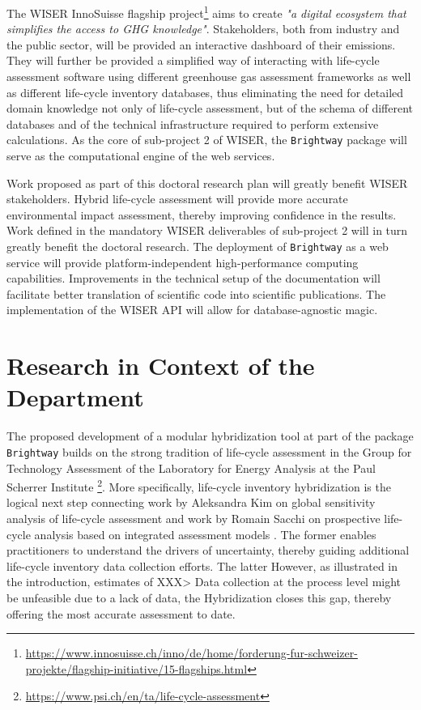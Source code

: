 \documentclass{article}
\begin{document}
    The WISER InnoSuisse flagship project\footnote{\url{https://www.innosuisse.ch/inno/de/home/forderung-fur-schweizer-projekte/flagship-initiative/15-flagships.html}} aims to create \textit{"a digital ecosystem that simplifies the access to GHG knowledge"}. Stakeholders, both from industry and the public sector, will be provided an interactive dashboard of their emissions. They will further be provided a simplified way of interacting with life-cycle assessment software using different greenhouse gas assessment frameworks as well as different life-cycle inventory databases, thus eliminating the need for detailed domain knowledge not only of life-cycle assessment, but of the schema of different databases and of the technical infrastructure required to perform extensive calculations. As the core of sub-project 2 of WISER, the \texttt{Brightway} package will serve as the computational engine of the web services.
    
    Work proposed as part of this doctoral research plan will greatly benefit WISER stakeholders. Hybrid life-cycle assessment will provide more accurate environmental impact assessment, thereby improving confidence in the results. Work defined in the mandatory WISER deliverables of sub-project 2 will in turn greatly benefit the doctoral research. The deployment of \texttt{Brightway} as a web service will provide platform-independent high-performance computing capabilities. Improvements in the technical setup of the documentation will facilitate better translation of scientific code into scientific publications. The implementation of the WISER API will allow for database-agnostic magic.
    
\section{Research in Context of the Department}

    The proposed development of a modular hybridization tool at part of the package \texttt{Brightway} builds on the strong tradition of life-cycle assessment in the Group for Technology Assessment of the Laboratory for Energy Analysis at the Paul Scherrer Institute \footnote{\url{https://www.psi.ch/en/ta/life-cycle-assessment}}. More specifically, life-cycle inventory hybridization is the logical next step connecting work by Aleksandra Kim on global sensitivity analysis of life-cycle assessment \cite{kim_aleksandra-kimgwp_uncertainties_2022}\cite{kim_aleksandra-kimgsa_framework_2021}\cite{paulillo_influential_2021} and work by Romain Sacchi on prospective life-cycle analysis based on integrated assessment models \cite{noauthor_premise_2022}\cite{sacchi_prospective_2022}. The former enables practitioners to understand the drivers of uncertainty, thereby guiding additional life-cycle inventory data collection efforts. The latter 
    However, as illustrated in the introduction, estimates of XXX> Data collection at the process level might be unfeasible due to a lack of data, the 
    Hybridization closes this gap, thereby offering the most accurate assessment to date.
    
\end{document}
